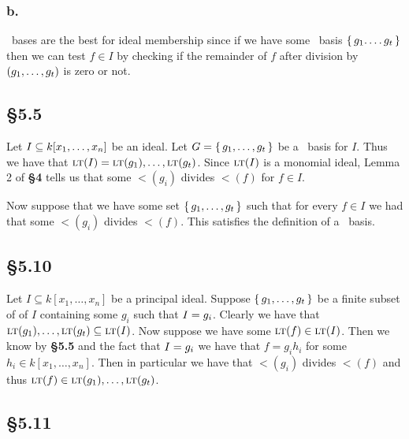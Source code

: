 \documentclass[letterpaper]{article}
\begin{document}
\subsubsection{b.}

\Grobner\ bases are the best for ideal membership since if we have some \Grobner\ basis $\set{g_{1}. \ldots g_{t}}$ then we can test $f \in I$ by checking if the remainder of $f$ after division by $\pqty{g_{1}, \ldots, g_{t}}$ is zero or not.

\clearpage

\subsection{\S 5.5}

Let $I \subseteq k\bqty{x_{1}, \ldots, x_{n}}$ be an ideal. Let $G = \set{g_{1}, \ldots, g_{t}}$ be a \Grobner\ basis for $I$. Thus we have that $\gen{\lt(I)} = \gen{\lt(g_{1}), \ldots, \lt(g_{t})}$. Since $\gen{\lt(I)}$ is a monomial ideal, Lemma 2 of \textbf{\S 4} tells us that some $\lt(g_{i})$ divides $\lt(f)$ for $f \in I$.

Now suppose that we have some set $\set{g_{1}, \ldots, g_{t}}$ such that for every $f \in I$ we had that some $\lt(g_{i})$ divides $\lt(f)$. This satisfies the definition of a \Grobner\ basis.

\subsection{\S 5.10}

Let $I \subseteq k[x_{1}, \ldots, x_{n}]$ be a principal ideal. Suppose $\set{g_{1}, \ldots, g_{t}}$ be a finite subset of of $I$ containing some $g_{i}$ such that $I = \gen{g_{i}}$. Clearly we have that $\gen{\lt(g_{1}), \ldots, \lt(g_{t})} \subseteq \gen{\lt(I)}$. Now suppose we have some $\lt(f) \in \gen{\lt(I)}$. Then we know by \textbf{\S 5.5} and the fact that $I = \gen{g_{i}}$ we have that $f = g_{i} h_{i}$ for some $h_{i} \in k[x_{1}, \ldots, x_{n}]$. Then in particular we have that $\lt(g_{i})$ divides $\lt(f)$ and thus $\lt(f) \in \gen{\lt(g_{1}), \ldots, \lt(g_{t})}$.

\subsection{\S 5.11}
\end{document}
